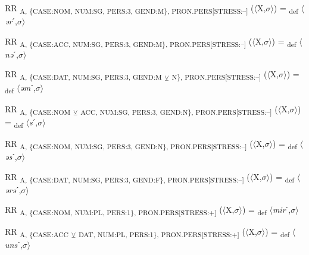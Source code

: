 {\begin{exe}
 RR \textsubscript{A, \{CASE:NOM, NUM:SG, PERS:3, GEND:M\}, PRON.PERS[STRESS:–]} ($\langle$X,$\sigma $$\rangle$) = \textsubscript{def} $\langle$\textit{ər}ˊ,$\sigma $$\rangle$
\end{exe}

\begin{exe}
 RR \textsubscript{A, \{CASE:ACC, NUM:SG, PERS:3, GEND:M\}, PRON.PERS[STRESS:–]} ($\langle$X,$\sigma $$\rangle$) = \textsubscript{def} $\langle$\textit{nə}ˊ,$\sigma $$\rangle$
\end{exe}

\begin{exe}
 RR \textsubscript{A, \{CASE:DAT, NUM:SG, PERS:3, GEND:M} \textsubscript{${\veebar}$}\textsubscript{ N\}, PRON.PERS[STRESS:–]} ($\langle$X,$\sigma $$\rangle$) = \textsubscript{def} $\langle$\textit{əm}ˊ,$\sigma $$\rangle$
\end{exe}

\begin{exe}
 RR \textsubscript{A, \{CASE:NOM} \textsubscript{${\veebar}$}\textsubscript{ ACC, NUM:SG, PERS:3, GEND:N\}, PRON.PERS[STRESS:–]} ($\langle$X,$\sigma $$\rangle$) = \textsubscript{def} $\langle$\textit{s}ˊ,$\sigma $$\rangle$
\end{exe}

\begin{exe}
 RR \textsubscript{A, \{CASE:NOM, NUM:SG, PERS:3, GEND:N\}, PRON.PERS[STRESS:–]} ($\langle$X,$\sigma $$\rangle$) = \textsubscript{def} $\langle$\textit{əs}ˊ,$\sigma $$\rangle$
\end{exe}

\begin{exe}
 RR \textsubscript{A, \{CASE:DAT, NUM:SG, PERS:3, GEND:F\}, PRON.PERS[STRESS:–]} ($\langle$X,$\sigma $$\rangle$) = \textsubscript{def} $\langle$\textit{ərə}ˊ,$\sigma $$\rangle$
\end{exe}

\begin{exe}
 RR \textsubscript{A, \{CASE:NOM, NUM:PL, PERS:1\}, PRON.PERS[STRESS:+]} ($\langle$X,$\sigma $$\rangle$) = \textsubscript{def} $\langle$\textit{mir}ˊ,$\sigma $$\rangle$
\end{exe}

\begin{exe}
 RR \textsubscript{A, \{CASE:ACC} \textsubscript{${\veebar}$}\textsubscript{ DAT, NUM:PL, PERS:1\}, PRON.PERS[STRESS:+]} ($\langle$X,$\sigma $$\rangle$) = \textsubscript{def} $\langle$\textit{uns}ˊ,$\sigma $$\rangle$
\end{exe}

}
